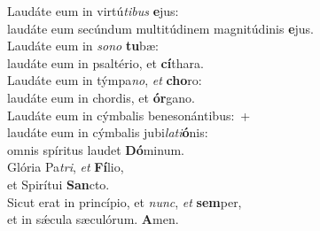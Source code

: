\evenverse Laudáte eum in virtú\textit{ti}\textit{bus} \textbf{e}jus:~\*\\
\evenverse laudáte eum secúndum multitúdinem magnitúdinis \textbf{e}jus.\\
\oddverse Laudáte eum in \textit{so}\textit{no} \textbf{tu}bæ:~\*\\
\oddverse laudáte eum in psaltério, et \textbf{cí}thara.\\
\evenverse Laudáte eum in týmpa\textit{no}, \textit{et} \textbf{cho}ro:~\*\\
\evenverse laudáte eum in chordis, et \textbf{ór}gano.\\
\oddverse Laudáte eum in cýmbalis benesonántibus:~+\\
\oddverse  laudáte eum in cýmbalis jubi\textit{la}\textit{ti}\textbf{ó}nis:~\*\\
\oddverse omnis spíritus laudet \textbf{Dó}minum.\\
\evenverse Glória Pa\textit{tri}, \textit{et} \textbf{Fí}lio,~\*\\
\evenverse et Spirítui \textbf{San}cto.\\
\oddverse Sicut erat in princípio, et \textit{nunc}, \textit{et} \textbf{sem}per,~\*\\
\oddverse et in sǽcula sæculórum. \textbf{A}men.\\
